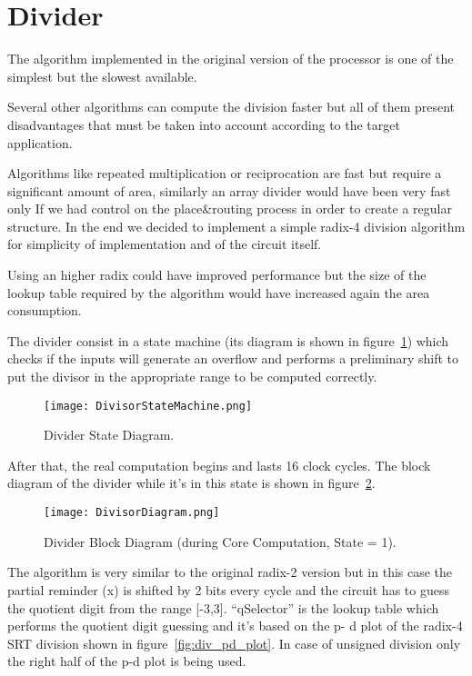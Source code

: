 \section{Divider}


The algorithm implemented in the original version of the processor is one of the simplest but the
slowest available.

Several other algorithms can compute the division faster but all of them present disadvantages
that must be taken into account according to the target application.

Algorithms like repeated multiplication or reciprocation are fast but require a significant amount
of area, similarly an array divider would have been very fast only If we had control on the
place\&routing process in order to create a regular structure. In the end we decided to implement
a simple radix-4 division algorithm for simplicity of implementation and of the circuit itself.

Using an higher radix could have improved performance but the size of the lookup table required
by the algorithm would have increased again the area consumption.

The divider consist in a state machine (its diagram is shown in figure~\ref{fig:div_state_dia}) which checks if the inputs will
generate an overflow and performs a preliminary shift to put the divisor in the appropriate range
to be computed correctly.


\begin{figure}[H]
\centering
\texttt{[image: DivisorStateMachine.png]}
\caption{Divider State Diagram.}
\label{fig:div_state_dia}
\end{figure}

After that, the real computation begins and lasts 16 clock cycles. The block diagram of the divider
while it's in this state is shown in figure~\ref{fig:div_block_dia}.

\begin{figure}[H]
\centering
\texttt{[image: DivisorDiagram.png]}
\caption{Divider Block Diagram (during Core Computation, State = 1).}
\label{fig:div_block_dia}
\end{figure}

The algorithm is very similar to the original radix-2 version but in this case the partial reminder (x)
is shifted by 2 bits every cycle and the circuit has to guess the quotient digit from the range [-3,3].
``qSelector'' is the lookup table which performs the quotient digit guessing and it's based on the p-
d plot of the radix-4 SRT division shown in figure~\ref{fig:div_pd_plot}. In case of unsigned division only the right half of
the p-d plot is being used.

